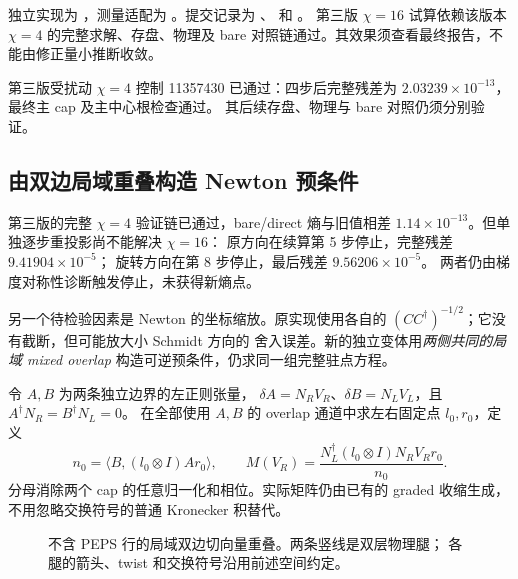 独立实现为 ，测量适配为
。提交记录为
、
 和
。
第三版 $\chi=16$ 试算依赖该版本 $\chi=4$ 的完整求解、存盘、物理及
bare 对照链通过。其效果须查看最终报告，不能由修正量小推断收敛。

第三版受扰动 $\chi=4$ 控制 11357430 已通过：四步后完整残差为
$2.03239\times10^{-13}$，最终主 cap 及主中心根检查通过。
其后续存盘、物理与 bare 对照仍须分别验证。

\subsection{由双边局域重叠构造 Newton 预条件}
第三版的完整 $\chi=4$ 验证链已通过，bare/direct 熵与旧值相差
$1.14\times10^{-13}$。但单独逐步重投影尚不能解决 $\chi=16$：
原方向在续算第 5 步停止，完整残差 $9.41904\times10^{-5}$；
旋转方向在第 8 步停止，最后残差 $9.56206\times10^{-5}$。
两者仍由梯度对称性诊断触发停止，未获得新熵点。

另一个待检验因素是 Newton 的坐标缩放。原实现使用各自的
$(C C^\dagger)^{-1/2}$；它没有截断，但可能放大小 Schmidt 方向的
舍入误差。新的独立变体用\emph{两侧共同的局域 mixed overlap}
构造可逆预条件，仍求同一组完整驻点方程。

令 $A,B$ 为两条独立边界的左正则张量，
$\delta A=N_R V_R$、$\delta B=N_L V_L$，且
$A^\dagger N_R=B^\dagger N_L=0$。
在全部使用 $A,B$ 的 overlap 通道中求左右固定点 $l_0,r_0$，定义
\begin{equation}
 n_0=\langle B,(l_0\otimes I)A r_0\rangle,\qquad
 M(V_R)=\frac{N_L^\dagger(l_0\otimes I)N_R V_R r_0}{n_0}.
\end{equation}
分母消除两个 cap 的任意归一化和相位。实际矩阵仍由已有的 graded
收缩生成，不用忽略交换符号的普通 Kronecker 积替代。

\begin{figure}[htbp]
\centering
{}
\caption{不含 PEPS 行的局域双边切向量重叠。两条竖线是双层物理腿；
各腿的箭头、twist 和交换符号沿用前述空间约定。}
\end{figure}


